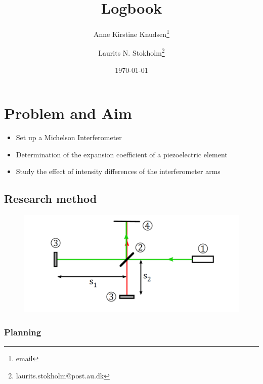 \documentclass[a4paper, oneside, onecolumn, 11pt]{memoir}
\title{Logbook}
\author{Anne Kirstine Knudsen\thanks{email} \and Laurits N. Stokholm\thanks{laurits.stokholm@post.au.dk}}
\date{\today}
\begin{document}
\maketitle

\section{Problem and Aim}
\begin{itemize}
    \item Set up a Michelson Interferometer
    \item Determination of the expansion coefficient of a piezoelectric element
    \item Study the effect of intensity differences of the interferometer arms
\end{itemize}


\subsection{Research method}
\begin{figure}[h!]
    \centering
    \includegraphics[width=\columnwidth]{michelsonsetup}
    \label{fig:michelsonsetup}
\end{figure}

\subsubsection{Planning}
\end{document}
